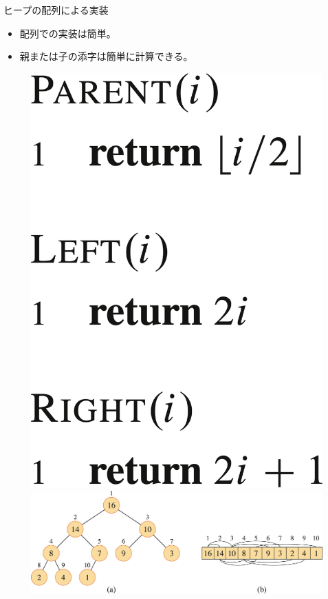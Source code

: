 \documentclass[unicode,11pt,aspectratio=169,notes]{beamer} %
\begin{document}
\begin{frame}{ヒープの配列による実装}
  \begin{itemize}
    \item 配列での実装は簡単。
    \item 親または子の添字は簡単に計算できる。
  \end{itemize}
  \begin{figure}
    \includegraphics[height=0.4\textheight]{../resources/pseudo-06-01}
    \includegraphics[height=0.4\textheight]{../resources/fig06.01}
  \end{figure}
\end{frame}
\end{document}
